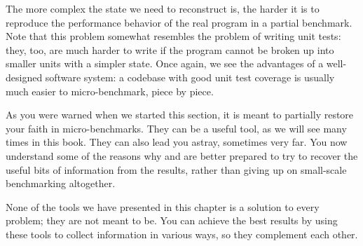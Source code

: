 The more complex the state we need to reconstruct is, the harder it is to reproduce the performance behavior of the real program in a partial benchmark. Note that this problem somewhat resembles the problem of writing unit tests: they, too, are much harder to write if the program cannot be broken up into smaller units with a simpler state. Once again, we see the advantages of a well-designed software system: a codebase with good unit test coverage is usually much easier to micro-benchmark, piece by piece.

As you were warned when we started this section, it is meant to partially restore your faith in micro-benchmarks. They can be a useful tool, as we will see many times in this book. They can also lead you astray, sometimes very far. You now understand some of the reasons why and are better prepared to try to recover the useful bits of information from the results, rather than giving up on small-scale benchmarking altogether.

None of the tools we have presented in this chapter is a solution to every problem; they are not meant to be. You can achieve the best results by using these tools to collect information in various ways, so they complement each other.






